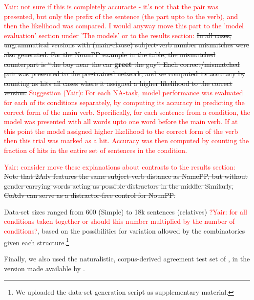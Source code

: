 \textcolor{red}{Yair: not sure if this is completely accuracte - it's not that the pair was presented, but only the prefix of the sentence (the part upto to the verb), and then the likelihood was compared. I would anyway move this part to the 'model evaluation' section under 'The models' or to the results section:}
\sout{In all cases, ungrammatical versions with (main-clause)
subject-verb number mismatches were also generated. For the NounPP
example in the table, the mismatched counterpart is ``the boy near
the car \textbf{greet} the guy''. Each correct/mismatched pair was
presented to the pre-trained network, and we computed its accuracy by
counting as hits all cases where it assigned a higher likelihood to
the correct version.} \textcolor{red}{Suggestion (Yair): For each NA-task, model performance was evaluated for each of its conditions separately, by computing its accuracy in predicting the correct form of the main verb. Specifically, for each sentence from a condition, the model was presented with all words upto one word before the main verb. If at this point the model assigned higher likelihood to the correct form of the verb then this trial was marked as a hit. Accuracy was then computed by counting the fraction of hits in the entire set of sentences in the condition.}

\textcolor{red}{Yair: consider move these explanations about contrasts to the results section:} \sout{Note that 2Adv features the same subject-verb
distance as NamePP, but without gender-carrying words acting as
possible distractors in the middle. Similarly, CoAdv can serve as a
distractor-free control for NounPP.}

Data-set sizes ranged from 600 (Simple) to 18k sentences (relatives) \textcolor{red}{?Yair: for all conditions taken together or should this number multiplied by the number of conditions?},
based on the possibilities for variation allowed by the combinatorics
given each structure.\footnote{We uploaded the data-set generation
  script as supplementary material.}

Finally, we also used the naturalistic, corpus-derived agreement test set of , in the version made available by .




